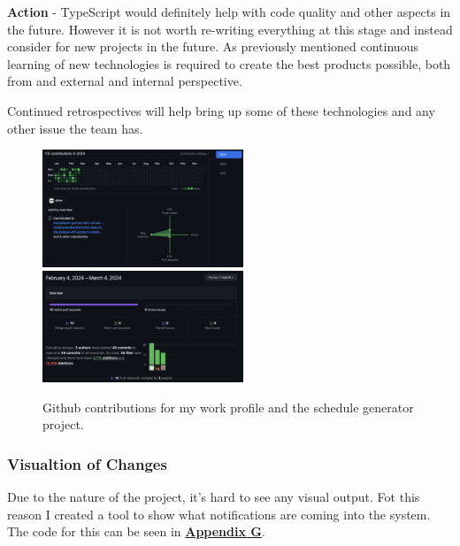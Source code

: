   \vspace{0.2cm}
  \textbf{Action} - TypeScript would definitely help with code quality and other aspects in the future. However it is not worth re-writing everything at this
  stage and instead consider for new projects in the future. As previously mentioned continuous learning of new technologies is required to create the 
  best products possible, both from and external and internal perspective. 
  
  Continued retrospectives will help bring up some of these technologies and any other issue the team has.

  \begin{figure}[H]
    \centering
    \includegraphics[width=6cm]{assets/outputs/githubContributions.png}
    \includegraphics[width=6cm]{assets/outputs/scheduleGeneratorChanges.png}

    \caption{Github contributions for my work profile and the schedule generator project.}
    \label{fig:githubStats}
  \end{figure}

  \subsubsection{Visualtion of Changes}
  Due to the nature of the project, it's hard to see any visual output. Fot this reason I created a tool to show what notifications are coming 
  into the system. The code for this can be seen in \hyperref[sec:sec:AppendixG]{\textbf{Appendix G}}.

\newpage
